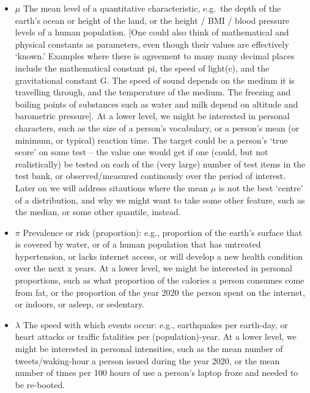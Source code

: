 \documentclass[]{book}
\begin{document}
\begin{itemize}
\item
  \(\mu\) The mean level of a quantitative characteristic, e.g.~the depth of the earth's ocean or height of the land, or the height / BMI / blood pressure levels of a human population. {[}One could also think of mathematical and physical constants as parameters, even though their values are effectively `known.' Examples where there is agreement to many many decimal places include the mathematical constant pi, the speed of light(c), and the gravitational constant G. The speed of sound depends on the medium it is travelling through, and the temperature of the medium. The freezing and boiling points of substances such as water and milk depend on altitude and barometric pressure{]}. At a lower level, we might be interested in personal characters, such as the size of a person's vocabulary, or a person's mean (or minimum, or typical) reaction time. The target could be a person's `true score' on some test -- the value one would get if one (could, but not realistically) be tested on each of the (very large) number of test items in the test bank, or observed/measured continously over the period of interest.\\
  \hspace*{0.333em}\hspace*{0.333em}\hspace*{0.333em}\hspace*{0.333em}Later on we will address sitautions where the mean \(\mu\) is not the best `centre' of a distribution, and why we might want to take some other feature, such as the median, or some other quantile, instead.
\item
  \(\pi\) Prevalence or risk (proportion): e.g., proportion of the earth's surface that is covered by water, or of a human population that has untreated hypertension, or lacks internet access, or will develop a new health condition over the next x years. At a lower level, we might be interested in personal proportions, such as what proportion of the calories a person consumes come from fat, or the proportion of the year 2020 the person spent on the internet, or indoors, or asleep, or sedentary.
\item
  \(\lambda\) The speed with which events occur: e.g., earthquakes per earth-day, or heart attacks or traffic fatalities per (population)-year. At a lower level, we might be interested in personal intensities, such as the mean number of tweets/waking-hour a person issued during the year 2020, or the mean number of times per 100 hours of use a person's laptop froze and needed to be re-booted.
\end{itemize}
\end{document}
